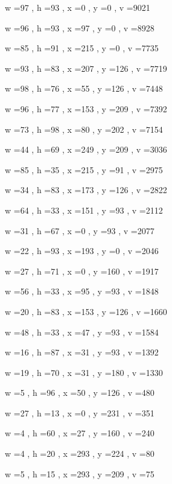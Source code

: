 \documentclass[11pt]{article}
\begin{document}
w =97 , h =93 , x =0 , y =0 , v =9021
\par
w =96 , h =93 , x =97 , y =0 , v =8928
\par
w =85 , h =91 , x =215 , y =0 , v =7735
\par
w =93 , h =83 , x =207 , y =126 , v =7719
\par
w =98 , h =76 , x =55 , y =126 , v =7448
\par
w =96 , h =77 , x =153 , y =209 , v =7392
\par
w =73 , h =98 , x =80 , y =202 , v =7154
\par
w =44 , h =69 , x =249 , y =209 , v =3036
\par
w =85 , h =35 , x =215 , y =91 , v =2975
\par
w =34 , h =83 , x =173 , y =126 , v =2822
\par
w =64 , h =33 , x =151 , y =93 , v =2112
\par
w =31 , h =67 , x =0 , y =93 , v =2077
\par
w =22 , h =93 , x =193 , y =0 , v =2046
\par
w =27 , h =71 , x =0 , y =160 , v =1917
\par
w =56 , h =33 , x =95 , y =93 , v =1848
\par
w =20 , h =83 , x =153 , y =126 , v =1660
\par
w =48 , h =33 , x =47 , y =93 , v =1584
\par
w =16 , h =87 , x =31 , y =93 , v =1392
\par
w =19 , h =70 , x =31 , y =180 , v =1330
\par
w =5 , h =96 , x =50 , y =126 , v =480
\par
w =27 , h =13 , x =0 , y =231 , v =351
\par
w =4 , h =60 , x =27 , y =160 , v =240
\par
w =4 , h =20 , x =293 , y =224 , v =80
\par
w =5 , h =15 , x =293 , y =209 , v =75
\par
\newpage
\end{document}
